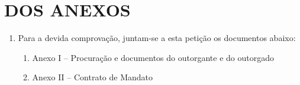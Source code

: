 \section{DOS ANEXOS}

\begin{enumerate}[resume]
\item Para a devida comprovação, juntam-se a esta petição os documentos abaixo:
  \begin{enumerate}
    \item Anexo I – Procuração e documentos do outorgante e do outorgado
    \item Anexo II – Contrato de Mandato
  \end{enumerate}
\end{enumerate}